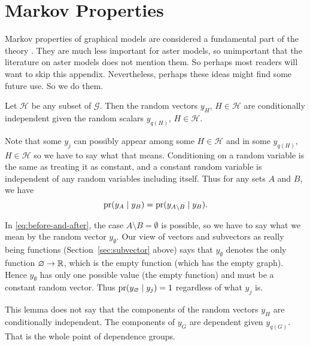 
\chapter{Markov Properties}
\label{app:markov}

Markov properties of graphical models are considered a fundamental part
of the theory \citep[Section~3.2]{lauritzen}.  They are much less important
for aster models, so unimportant that the literature on aster models
does not mention them.
So perhaps most readers will want to skip this appendix.  Nevertheless,
perhaps these ideas might find some future use.  So we do them.

\begin{lemma} \label{lem:markov}
Let $\mathcal{H}$ be any subset of $\mathcal{G}$.  Then the random vectors
$y_H$, $H \in \mathcal{H}$ are conditionally independent given
the random scalars $y_{q(H)}$, $H \in \mathcal{H}$.
\end{lemma}

Note that some $y_j$ can possibly appear among some $H \in \mathcal{H}$
and in some $y_{q(H)}$, $H \in \mathcal{H}$ so we have to say what that means.
Conditioning on a random variable is the same as treating it as constant,
and a constant random variable is independent of any random variables
including itself.  Thus for any sets $A$ and $B$, we have
\begin{equation} \label{eq:before-and-after}
   \operatorname{pr}(y_A \mid y_B)
   =
   \operatorname{pr}(y_{A \setminus B} \mid y_B).
\end{equation}

In \eqref{eq:before-and-after}, the case $A \setminus B = \emptyset$
is possible,
so we have to say what we mean by the random vector $y_\emptyset$.
Our view of vectors and subvectors as really
being functions (Section~\ref{sec:subvector} above) says that $y_\emptyset$
denotes the only function $\varnothing \to \mathbb{R}$, which is the empty function
(which has the empty graph).  Hence $y_\emptyset$ has only one possible
value (the empty function) and must be a constant random vector.
Thus $\operatorname{pr}(y_\varnothing \mid y_j) = 1$ regardless of what $y_j$ is.

This lemma does not say that the components of the random vectors $y_H$ are
conditionally independent.  The components of $y_G$ are dependent given
$y_{q(G)}$.  That is the whole point of dependence groups.

